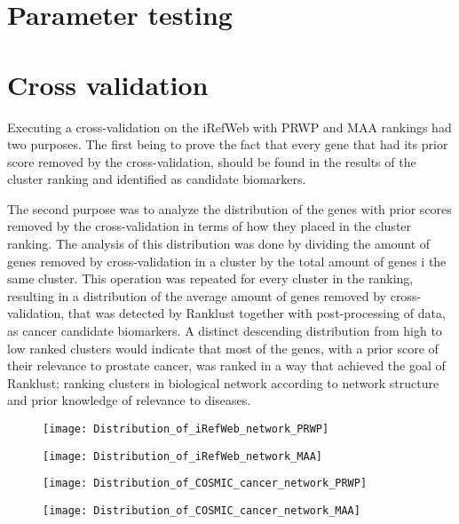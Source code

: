 \section{Parameter testing}
\section{Cross validation}
Executing a cross-validation on the iRefWeb with PRWP and MAA rankings had two
purposes. The first being to prove the fact that every gene that had its prior
score removed by the cross-validation, should be found in the results of the
cluster ranking and identified as candidate biomarkers. 

The second purpose was to analyze the distribution of the genes with prior
scores removed by the cross-validation in terms of how they placed in the
cluster ranking. The analysis of this distribution was done by dividing the
amount of genes removed by cross-validation in a cluster by the total amount of
genes i the same cluster. This operation was repeated for every cluster in the
ranking, resulting in a distribution of the average amount of genes removed by
cross-validation, that was detected by Ranklust together with post-processing of
data, as cancer candidate biomarkers. A distinct descending distribution from
high to low ranked clusters would indicate that most of the genes, with a prior
score of their relevance to prostate cancer, was ranked in a way that achieved
the goal of Ranklust; ranking clusters in biological network according to
network structure and prior knowledge of relevance to diseases.

\begin{figure}
    \label{fig:irefweb-prwp}
    \texttt{[image: Distribution\_of\_iRefWeb\_network\_PRWP]}
\end{figure}
\begin{figure}
    \label{fig:irefweb-maa}
    \texttt{[image: Distribution\_of\_iRefWeb\_network\_MAA]}
\end{figure}
\begin{figure}
    \label{fig:cosmic-prwp}
    \texttt{[image: Distribution\_of\_COSMIC\_cancer\_network\_PRWP]}
\end{figure}
\begin{figure}
    \label{fig:cosmic-maa}
    \texttt{[image: Distribution\_of\_COSMIC\_cancer\_network\_MAA]}
\end{figure}

